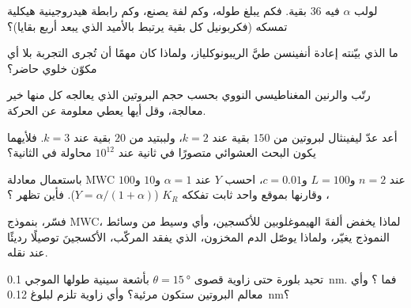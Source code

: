 \begin{exercise}[$\star$]\label{exo:b3:structural-biology:2}
لولب $\alpha$ فيه $36$ بقية. فكم يبلغ طوله، وكم لفة
يصنع، وكم رابطة هيدروجينية هيكلية تمسكه
(فكربونيل كل بقية يرتبط بالأميد الذي يبعد أربع بقايا)؟
\end{exercise}

\begin{exercise}[$\star$]\label{exo:b3:structural-biology:3}
ما الذي بيّنته إعادة أنفينسن طيَّ الريبونوكلياز، ولماذا كان مهمًا
أن تُجرى التجربة بلا أي مكوّن خلوي حاضر؟
\end{exercise}

\begin{exercise}[$\star$]\label{exo:b3:structural-biology:4}
رتّب  والرنين المغناطيسي النووي  بحسب حجم
البروتين الذي يعالجه كل منها خير معالجة، وقل أيها يعطي معلومة عن
الحركة.
\end{exercise}

\begin{exercise}[$\star\star$]\label{exo:b3:structural-biology:5}
أعد عدّ ليفينثال لبروتين من $150$ بقية عند $k = 2$،
ولببتيد من $20$ بقية عند $k = 3$. فلأيهما
يكون البحث العشوائي متصورًا في ثانية عند $10^{12}$ محاولة في
الثانية؟
\end{exercise}

\begin{exercise}[$\star\star$]\label{exo:b3:structural-biology:6}
باستعمال معادلة MWC عند $n = 2$ و$L = 100$ و$c = 0.01$، احسب
$Y$ عند $\alpha = 1$ و$10$ و$100$، وقارنها بموقع واحد
ثابت تفككه $K_{R}$ ($Y = \alpha/(1+\alpha)$). فأين تظهر
؟
\end{exercise}

\begin{exercise}[$\star\star$]\label{exo:b3:structural-biology:7}
فسّر، بنموذج MWC، لماذا يخفض 
ألفةَ الهيموغلوبين للأكسجين، وأي وسيط من وسائط النموذج
يغيّر، ولماذا يوصّل الدم المخزون، الذي يفقد المركّب،
الأكسجينَ توصيلًا رديئًا عند نقله.
\end{exercise}

\begin{exercise}[$\star\star$]\label{exo:b3:structural-biology:8}
تحيد بلورة حتى زاوية قصوى $\theta = \qty{15}{\degree}$
بأشعة سينية طولها الموجي \qty{0.1}{nm}. فما ؟ وأي
معالم البروتين ستكون مرئية؟ وأي زاوية تلزم
لبلوغ \qty{0.12}{nm}؟
\end{exercise}

